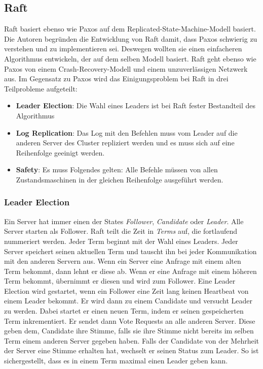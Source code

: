 \subsection{Raft}

Raft \cite{raft, raft-thesis} basiert ebenso wie Paxos auf dem Replicated-State-Machine-Modell basiert. Die Autoren begründen die Entwicklung von Raft damit, dass Paxos schwierig zu verstehen und zu implementieren sei. Deswegen wollten sie einen einfacheren Algorithmus entwickeln, der auf dem selben Modell basiert. Raft geht ebenso wie Paxos von einem Crash-Recovery-Modell und einem unzuverlässigen Netzwerk aus.
Im Gegensatz zu Paxos wird das Einigungsproblem bei Raft in drei Teilprobleme aufgeteilt:
\begin{itemize}
	\item \textbf{Leader Election}: Die Wahl eines Leaders ist bei Raft fester Bestandteil des Algorithmus 
	\item \textbf{Log Replication}: Das Log mit den Befehlen muss vom Leader auf die anderen Server des Cluster repliziert werden und es muss sich auf eine Reihenfolge geeinigt werden.
	\item \textbf{Safety}: Es muss Folgendes gelten: Alle Befehle müssen von allen Zustandsmaschinen in der gleichen Reihenfolge ausgeführt werden.
\end{itemize}

\subsubsection{Leader Election}

Ein Server hat immer einen der States \textit{Follower}, \textit{Candidate} oder \textit{Leader}. Alle Server starten als Follower. Raft teilt die Zeit in \textit{Terms} auf, die fortlaufend nummeriert werden. Jeder Term beginnt mit der Wahl eines Leaders. Jeder Server speichert seinen aktuellen Term und tauscht ihn bei jeder Kommunikation mit den anderen Servern aus. Wenn ein Server eine Anfrage mit einem alten Term bekommt, dann lehnt er diese ab. Wenn er eine Anfrage mit einem höheren Term bekommt, übernimmt er diesen und wird zum Follower. Eine Leader Election wird gestartet, wenn ein Follower eine Zeit lang keinen Heartbeat von einem Leader bekommt. Er wird dann zu einem Candidate und versucht Leader zu werden. Dabei startet er einen neuen Term, indem er seinen gespeicherten Term inkrementiert. Er sendet dann Vote Requests an alle anderen Server. Diese geben dem, Candidate ihre Stimme, falls sie ihre Stimme nicht bereits im selben Term einem anderen Server gegeben haben. Falls der Candidate von der Mehrheit der Server eine Stimme erhalten hat, wechselt er seinen Status zum Leader. So ist sichergestellt, dass es in einem Term maximal einen Leader geben kann. 

